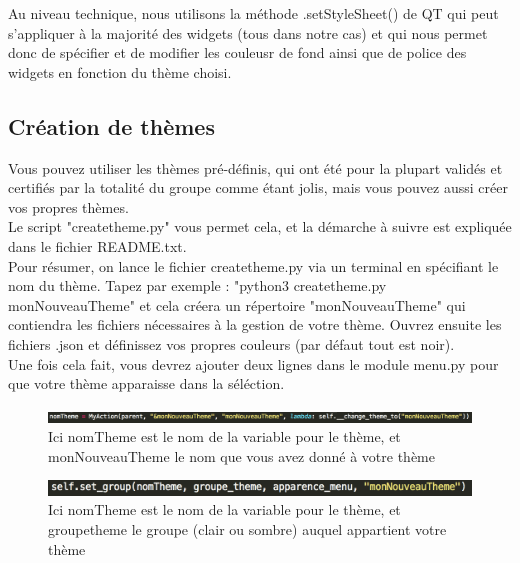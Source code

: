 \documentclass[a4paper,12pt]{article}
\begin{document}
			Au niveau technique, nous utilisons la méthode .setStyleSheet() de QT qui peut s'appliquer à la majorité des widgets (tous dans notre cas) et qui nous permet donc de spécifier et de modifier les couleusr de fond ainsi que de police des widgets en fonction du thème choisi.
			
		\subsection{Création de thèmes}
		
			Vous pouvez utiliser les thèmes pré-définis, qui ont été pour la plupart validés et certifiés par la totalité du groupe comme étant jolis, mais vous pouvez aussi créer vos propres thèmes.\\
			
			Le script "createtheme.py" vous permet cela, et la démarche à suivre est expliquée dans le fichier README.txt.\\
			
			Pour résumer, on lance le fichier createtheme.py via un terminal en spécifiant le nom du thème. Tapez par exemple :
			"python3 createtheme.py monNouveauTheme" et cela créera un répertoire "monNouveauTheme" qui contiendra les fichiers nécessaires à la gestion de votre thème. Ouvrez ensuite les fichiers .json et définissez vos propres couleurs (par défaut tout est noir).\\
			
			Une fois cela fait, vous devrez ajouter deux lignes dans le module menu.py pour que votre thème apparaisse dans la séléction.

			\begin{figure}[h!]
				\begin{center}
					\includegraphics[scale=0.5]{images/imgs_themes/add2}
					\caption{Ici nomTheme est le nom de la variable pour le thème, et monNouveauTheme le nom que vous avez donné à votre thème}
				\end{center}
			\end{figure}
			\begin{figure}[h!]
				\begin{center}
					\includegraphics[scale=0.7]{images/imgs_themes/add1}
					\caption{Ici nomTheme est le nom de la variable pour le thème, et groupetheme le groupe (clair ou sombre) auquel appartient votre thème}
				\end{center}
			\end{figure}
			
\end{document}

